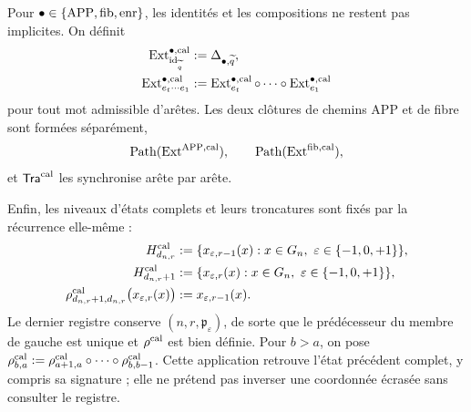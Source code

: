 Pour \(\bullet\in\{\mathrm{APP},{\rm fib},{\rm enr}\}\), les identités et les compositions ne restent pas implicites. On définit
\begin{align}
 \operatorname{Ext}^{\bullet,\rm cal}_{\operatorname{id}_{\widetilde q}}
   &:=\Delta_{\bullet,\widetilde q},\\
 \operatorname{Ext}^{\bullet,\rm cal}_{e_t\cdots e_1}
   &:=\operatorname{Ext}^{\bullet,\rm cal}_{e_t}\circ\cdots\circ
      \operatorname{Ext}^{\bullet,\rm cal}_{e_1}
 \label{hmtfg:eq:ext-palabra-calibrada-ch}
\end{align}
pour tout mot admissible d’arêtes. Les deux clôtures de chemins APP et de
fibre sont formées séparément,
\begin{equation}
 \operatorname{Path}(\operatorname{Ext}^{\mathrm{APP},\rm cal}),\qquad
 \operatorname{Path}(\operatorname{Ext}^{\rm fib,cal}),
 \label{hmtfg:eq:dos-clausuras-ext-ch}
\end{equation}
et \(\mathsf{Tra}^{\rm cal}\) les synchronise arête par arête.

Enfin, les niveaux d'états complets et leurs troncatures sont fixés par la récurrence elle-même :
\begin{align}
 H^{\rm cal}_{d_{n,r}}
   &:=\{x_{\varepsilon,r-1}(x):
          x\in G_n,\ \varepsilon\in\{-1,0,+1\}\},\\
 H^{\rm cal}_{d_{n,r}+1}
   &:=\{x_{\varepsilon,r}(x):
          x\in G_n,\ \varepsilon\in\{-1,0,+1\}\},\\
 \rho^{\rm cal}_{d_{n,r}+1,d_{n,r}}
   \bigl(x_{\varepsilon,r}(x)\bigr)
   &:=x_{\varepsilon,r-1}(x).
 \label{hmtfg:eq:truncamiento-calibrado-definido-ch}
\end{align}
Le dernier registre conserve \((n,r,\mathfrak p_\varepsilon)\), de sorte que
le prédécesseur du membre de gauche est unique et \(\rho^{\rm cal}\) est bien
définie. Pour \(b>a\), on pose
\(\rho^{\rm cal}_{b,a}:=\rho^{\rm cal}_{a+1,a}\circ\cdots\circ
\rho^{\rm cal}_{b,b-1}\). Cette application retrouve l’état précédent
complet, y compris sa signature ; elle ne prétend pas inverser une coordonnée écrasée
sans consulter le registre.

